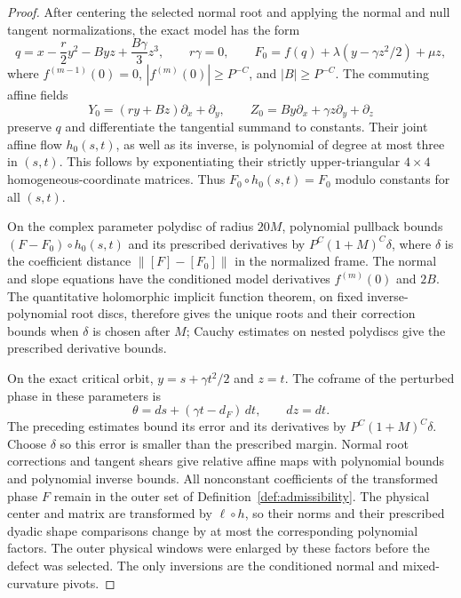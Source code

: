 \documentclass[11pt]{amsart}
\theoremstyle{definition}
\theoremstyle{remark}
\numberwithin{equation}{section}
\begin{document}
\begin{proof}
After centering the selected normal root and applying the normal and null tangent normalizations, the exact model has the form
\[
q=x-\frac r2y^2-Byz+\frac{B\gamma}{3}z^3,\qquad r\gamma=0,\qquad F_0=f(q)+\lambda(y-\gamma z^2/2)+\mu z,
\]
where $f^{(m-1)}(0)=0$, $|f^{(m)}(0)|\ge P^{-C}$, and $|B|\ge P^{-C}$. The commuting affine fields
\[
Y_0=(ry+Bz)\partial_x+\partial_y,\qquad Z_0=By\partial_x+\gamma z\partial_y+\partial_z
\]
preserve $q$ and differentiate the tangential summand to constants. Their joint affine flow $h_0(s,t)$, as well as its inverse, is polynomial of degree at most three in $(s,t)$. This follows by exponentiating their strictly upper-triangular $4\times4$ homogeneous-coordinate matrices. Thus $F_0\circ h_0(s,t)=F_0$ modulo constants for all $(s,t)$.

On the complex parameter polydisc of radius $20M$, polynomial pullback bounds $(F-F_0)\circ h_0(s,t)$ and its prescribed derivatives by $P^C(1+M)^C\delta$, where $\delta$ is the coefficient distance $\|[F]-[F_0]\|$ in the normalized frame. The normal and slope equations have the conditioned model derivatives $f^{(m)}(0)$ and $2B$. The quantitative holomorphic implicit function theorem, on fixed inverse-polynomial root discs, therefore gives the unique roots and their correction bounds when $\delta$ is chosen after $M$; Cauchy estimates on nested polydiscs give the prescribed derivative bounds.

On the exact critical orbit, $y=s+\gamma t^2/2$ and $z=t$. The coframe of the perturbed phase in these parameters is
\[
\theta=ds+(\gamma t-d_F)\,dt,\qquad dz=dt.
\]
The preceding estimates bound its error and its derivatives by $P^C(1+M)^C\delta$. Choose $\delta$ so this error is smaller than the prescribed margin. Normal root corrections and tangent shears give relative affine maps with polynomial bounds and polynomial inverse bounds. All nonconstant coefficients of the transformed phase $F$ remain in the outer set of Definition~\ref{def:admissibility}. The physical center and matrix are transformed by $\ell\circ h$, so their norms and their prescribed dyadic shape comparisons change by at most the corresponding polynomial factors. The outer physical windows were enlarged by these factors before the defect was selected. The only inversions are the conditioned normal and mixed-curvature pivots.
\end{proof}
\end{document}
